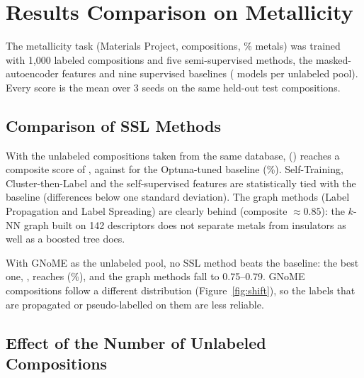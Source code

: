 \clearpage
\section{Results Comparison on Metallicity}

The metallicity task (Materials Project, \MetalN{} compositions, \MetalPos{}\% metals) was
trained with 1,000 labeled compositions and five semi-supervised methods, the masked-autoencoder
features and nine supervised baselines (\MetalInRuns{} models per unlabeled pool). Every score
is the mean over 3 seeds on the same \MetalInNTest{} held-out test compositions.

\subsection*{Comparison of SSL Methods}



With the unlabeled compositions taken from the same database, \MetalInBestMethod{}
(\texttt{\MetalInBestConfig}) reaches a composite score of \MetalInBestComp{}, against
\MetalInBaseComp{} for the Optuna-tuned \MetalInBaseConfig{} baseline (\MetalInImpr\%).
Self-Training, Cluster-then-Label and the self-supervised features are statistically tied with
the baseline (differences below one standard deviation). The graph methods (Label Propagation
and Label Spreading) are clearly behind (composite $\approx 0.85$): the $k$-NN graph built on
142 descriptors does not separate metals from insulators as well as a boosted tree does.

With GNoME as the unlabeled pool, no SSL method beats the baseline: the best one,
\MetalGnBestSSL{}, reaches \MetalGnBestSSLComp{} (\MetalGnImpr\%), and the graph methods fall
to 0.75--0.79. GNoME compositions follow a different distribution (Figure~\ref{fig:shift}), so the labels
that are propagated or pseudo-labelled on them are less reliable.

\subsection*{Effect of the Number of Unlabeled Compositions}


